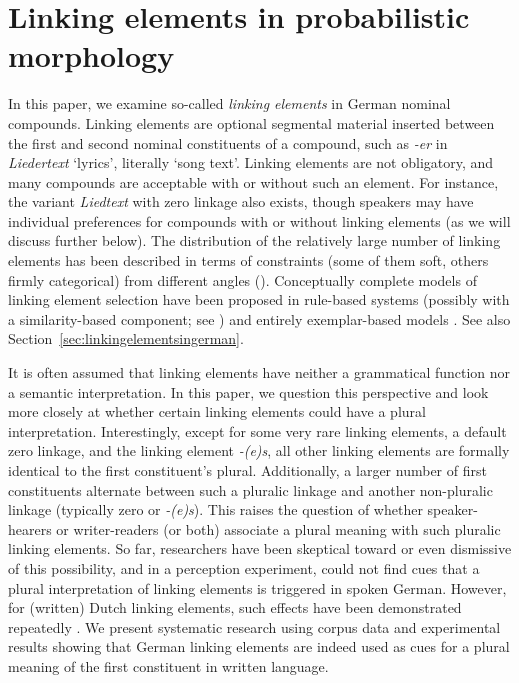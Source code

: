 \section{Linking elements in probabilistic morphology}
\label{sec:linkingelementsinprobabilisticmorphology}

In this paper, we examine so-called \textit{linking elements} in German nominal compounds.
Linking elements are optional segmental material inserted between the first and second nominal constituents of a compound, such as \textit{-er} in \textit{Liedertext} `lyrics', literally `song text'.
Linking elements are not obligatory, and many compounds are acceptable with or without such an element.
For instance, the variant \textit{Liedtext} with zero linkage also exists, though speakers may have individual preferences for compounds with or without linking elements (as we will discuss further below).
The distribution of the relatively large number of linking elements has been described in terms of constraints (some of them soft, others firmly categorical) from different angles (\egg \citealt{Fuhrhop1996,Wegener2003,Schluecker2012,NueblingSzczepaniak2013,FuhrhopKuerschner2015}).
Conceptually complete models of linking element selection have been proposed in rule-based systems (possibly with a similarity-based component; see \citealt{DresslerEa2001}) and entirely exemplar-based models \parencite{KrottEa2007}.
See also Section~\ref{sec:linkingelementsingerman}.

It is often assumed that linking elements have neither a grammatical function nor a semantic interpretation.
In this paper, we question this perspective and look more closely at whether certain linking elements could have a plural interpretation.
Interestingly, except for some very rare linking elements, a default zero linkage, and the linking element \textit{-(e)s}, all other linking elements are formally identical to the first constituent's plural.
Additionally, a larger number of first constituents alternate between such a pluralic linkage and another non-pluralic linkage (typically zero or \textit{-(e)s}).
This raises the question of whether speaker-hearers or writer-readers (or both) associate a plural meaning with such pluralic linking elements.
So far, researchers have been skeptical toward or even dismissive of this possibility, and in a perception experiment, \textcite{KoesterEa2004} could not find cues that a plural interpretation of linking elements is triggered in spoken German.
However, for (written) Dutch linking elements, such effects have been demonstrated repeatedly \parencite{SchreuderEa1998,BangaEa2012,BangaEa2013a,BangaEa2013b}.
We present systematic research using corpus data and experimental results showing that German linking elements are indeed used as cues for a plural meaning of the first constituent in written language.


